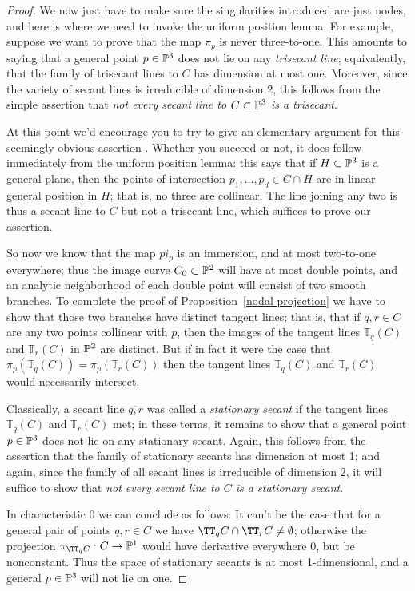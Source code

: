 \begin{proof}
We now just have to make sure the singularities introduced are just nodes, and here is where we need to invoke the uniform position lemma. For example, suppose we want to prove that the map $\pi_p$ is never three-to-one. This amounts to saying that a general point $p \in \PP^3$ does not lie on any \emph{trisecant line}; equivalently, that the family of trisecant lines to $C$ has dimension at most one. Moreover, since the variety of secant lines is irreducible of dimension 2, this follows from the simple assertion that \emph{not every secant line to $C \subset \PP^3$ is a trisecant}.

At this point we'd encourage you to try to give an elementary argument for this seemingly obvious assertion . Whether you succeed or not, it does follow immediately from the uniform position lemma: this says that if $H \subset \PP^3$ is a general plane, then the points of intersection $p_1,\dots,p_d \in C \cap H$ are in linear general position in $H$; that is, no three are collinear. The line joining any two is thus a secant line to $C$ but not a trisecant line, which suffices to prove our assertion.

So now we know that the map $pi_p$ is an immersion, and at most two-to-one everywhere; thus the image curve $C_0 \subset \PP^2$ will have at most double points, and an analytic neighborhood of each double point will consist of two smooth branches.
To complete the proof of Proposition~\ref{nodal projection} we have to show that those two branches have distinct tangent lines; that is, that
if $q, r \in C$ are any two points collinear with $p$, then the images of the tangent lines ${\mathbb T}_q(C)$ and ${\mathbb T}_r(C)$ in $\PP^2$ are distinct. But if in fact it were the case that  $\pi_p({\mathbb T}_q(C)) = \pi_p({\mathbb T}_r(C))$ then the tangent lines ${\mathbb T}_q(C)$ and ${\mathbb T}_r(C)$ would necessarily intersect.

Classically, a secant line $\overline{q,r}$ was called a \emph{stationary secant} if the tangent lines ${\mathbb T}_q(C)$ and ${\mathbb T}_r(C)$ met; in these terms, it remains to show that a general point $p \in \PP^3$ does not lie on any stationary secant. Again, this follows from the assertion that the family of stationary secants has dimension at most 1; and again, since the family of all secant lines is irreducible of dimension 2, it will suffice to show that \emph{not every secant line to $C$ is a stationary secant}.

In characteristic 0 we can conclude as follows: It can't be the case that for a general pair of points $q, r \in C$ we have $\TT_qC \cap \TT_rC \neq \emptyset$; otherwise the projection $\pi_{\TT_qC} : C \to \PP^1$ would have derivative everywhere 0, but be nonconstant. Thus the space of  stationary secants is at most 1-dimensional, and a general $p \in \PP^3$ will not lie on one.
\end{proof}

